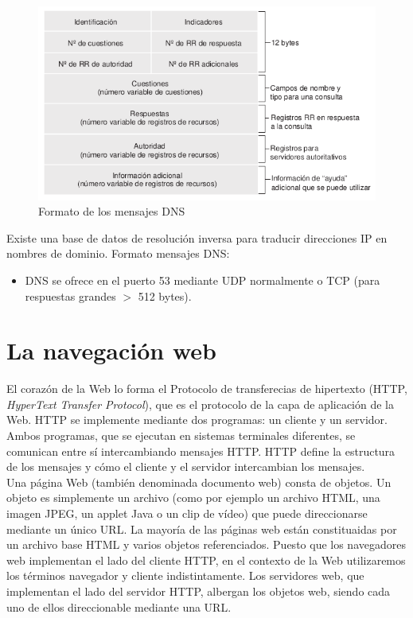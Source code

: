 \documentclass[a4paper,11pt]{article}
\begin{document}
\begin{figure}[h]
\centering
\caption{Formato de los mensajes DNS}
\includegraphics[scale=1,width=1\textwidth]{formato_dns.png}
\end{figure}

Existe una base de datos de resolución inversa para traducir direcciones IP en nombres de dominio. Formato mensajes DNS:
\begin{itemize}
\item DNS se ofrece en el puerto 53 mediante UDP normalmente o TCP (para respuestas grandes $>$ 512 bytes).
\end{itemize}

\section{La navegación web}
El corazón de la Web lo forma el Protocolo de transferecias de hipertexto (HTTP, \textit{HyperText Transfer Protocol}), que es el protocolo de la capa de aplicación de la Web. HTTP se implemente mediante dos programas: un cliente y un servidor. Ambos programas, que se ejecutan en sistemas terminales diferentes, se comunican entre sí intercambiando mensajes HTTP. HTTP define la estructura de los mensajes y cómo el cliente y el servidor intercambian los mensajes. \\

Una página Web (también denominada documento web) consta de objetos. Un objeto es simplemente un archivo (como por ejemplo un archivo HTML, una imagen JPEG, un applet Java o un clip de vídeo) que puede direccionarse mediante un único URL. La mayoría de las páginas web están constituaidas por un archivo base HTML y varios objetos referenciados. Puesto que los navegadores web implementan el lado del cliente HTTP, en el contexto de la Web utilizaremos los términos navegador y cliente indistintamente. Los servidores web, que implementan el lado del servidor HTTP, albergan los objetos web, siendo cada uno de ellos direccionable mediante una URL. \\
\end{document}
